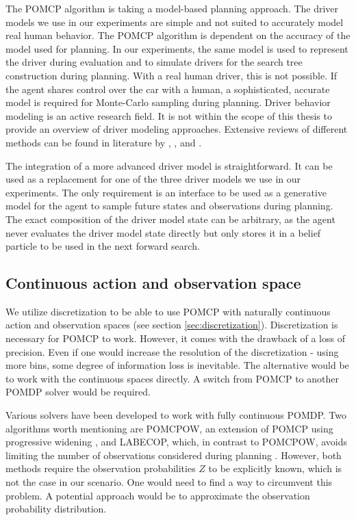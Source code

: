 The POMCP algorithm is taking a model-based planning approach. The driver models we use in our experiments are simple and not suited to accurately model real human behavior. The POMCP algorithm is dependent on the accuracy of the model used for planning. In our experiments, the same model is used to represent the driver during evaluation and to simulate drivers for the search tree construction during planning. With a real human driver, this is not possible. If the agent shares control over the car with a human, a sophisticated, accurate model is required for Monte-Carlo sampling during planning. Driver behavior modeling is an active research field. It is not within the scope of this thesis to provide an overview of driver modeling approaches. Extensive reviews of different methods can be found in literature by \cite{model-review-3}, \cite{model-review-4}, and \cite{model-review-5}.

The integration of a more advanced driver model is straightforward. It can be used as a replacement for one of the three driver models we use in our experiments. The only requirement is an interface to be used as a generative model for the agent to sample future states and observations during planning. The exact composition of the driver model state can be arbitrary, as the agent never evaluates the driver model state directly but only stores it in a belief particle to be used in the next forward search.

\subsection{Continuous action and observation space}
\label{sec:conclusion-continuous}

We utilize discretization to be able to use POMCP with naturally continuous action and observation spaces (see section \ref{sec:discretization}). Discretization is necessary for POMCP to work. However, it comes with the drawback of a loss of precision. Even if one would increase the resolution of the discretization - using more bins, some degree of information loss is inevitable. The alternative would be to work with the continuous spaces directly. A switch from POMCP to another POMDP solver would be required.

Various solvers have been developed to work with fully continuous POMDP. Two algorithms worth mentioning are POMCPOW, an extension of POMCP using progressive widening \parencite{online_pomdp_cont}, and LABECOP, which, in contrast to POMCPOW, avoids limiting the number of observations considered during planning \parencite{online-cont-pomdp-2}. However, both methods require the observation probabilities $Z$ to be explicitly known, which is not the case in our scenario. One would need to find a way to circumvent this problem. A potential approach would be to approximate the observation probability distribution.

